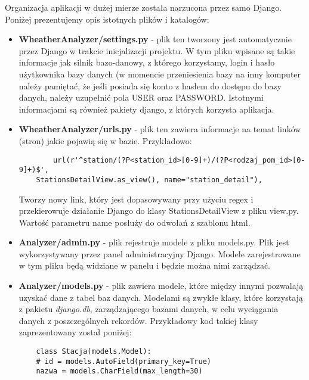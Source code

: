 Organizacja aplikacji w dużej mierze została narzucona przez samo Django. Poniżej prezentujemy opis istotnych plików i katalogów:
\begin{itemize}
	\item \textbf{WheatherAnalyzer/settings.py} - plik ten tworzony jest automatycznie przez Django w trakcie inicjalizacji projektu. W tym pliku wpisane są takie informacje jak silnik bazo-danowy, z którego korzystamy, login i hasło użytkownika bazy danych (w momencie przeniesienia bazy na inny komputer należy pamiętać, że jeśli posiada się konto z hasłem do dostępu do bazy danych, należy uzupełnić pola USER oraz PASSWORD. Istotnymi informacjami są również pakiety django, z których korzysta aplikacja.
	\item \textbf{WheatherAnalyzer/urls.py} - plik ten zawiera informacje na temat linków (stron) jakie pojawią się w bazie. Przykładowo:
	\begin{verbatim}
		url(r'^station/(?P<station_id>[0-9]+)/(?P<rodzaj_pom_id>[0-9]+)$',
 	StationsDetailView.as_view(), name="station_detail"),
	\end{verbatim}
Tworzy nowy link, który jest dopasowywany przy użyciu regex i przekierowuje działanie Django do klasy StationsDetailView z pliku view.py. Wartość parametru name posłuży do odwołań z szablonu html. 
	\item \textbf{Analyzer/admin.py} - plik rejestruje modele z pliku models.py. Plik jest wykorzystywany przez panel administracyjny Django. Modele zarejestrowane w tym pliku będą widziane w panelu i będzie można nimi zarządzać.
	\item \textbf{Analyzer/models.py} - plik zawiera modele, które między innymi pozwalają uzyskać dane z tabel baz danych. Modelami są zwykłe klasy, które korzystają z pakietu \textit{django.db}, zarządzającego bazami danych, w celu wyciągania danych z poszczególnych rekordów. Przykładowy kod takiej klasy zaprezentowany został poniżej:
	\begin{verbatim}
	class Stacja(models.Model):
    # id = models.AutoField(primary_key=True)
    nazwa = models.CharField(max_length=30)


\end{verbatim}
\end{itemize}
